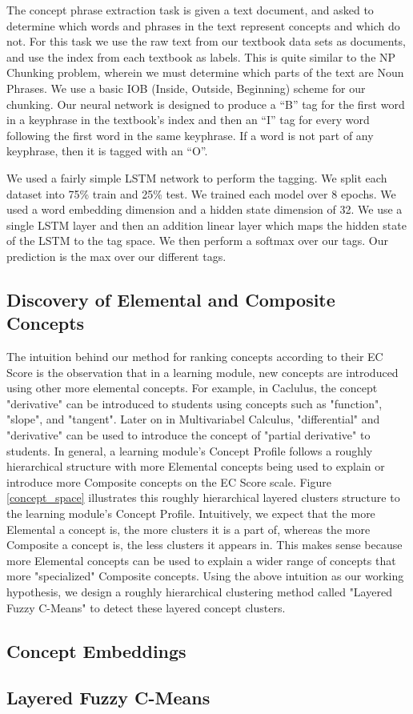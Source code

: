The concept phrase extraction task is given a text document, and asked to determine which words and phrases in the text represent concepts and which do not. For this task we use the raw text from our textbook data sets as documents, and use the index from each textbook as labels. This is quite similar to the NP Chunking problem, wherein we must determine which parts of the text are Noun Phrases. We use a basic IOB (Inside, Outside, Beginning) scheme for our chunking.
Our neural network is designed to produce a ``B'' tag for the first word in a keyphrase in the textbook's index and then an ``I'' tag for every word following the first word in the same keyphrase. If a word is not part of any keyphrase, then it is tagged with an ``O''.

We used a fairly simple LSTM network to perform the tagging. We split each dataset into 75\% train and 25\% test. We trained each model over 8 epochs. We used a word embedding dimension and a hidden state dimension of 32. We use a single LSTM layer and then an addition linear layer which maps the hidden state of the LSTM to the tag space. We then perform a softmax over our tags. Our prediction is the max over our different tags.


\subsection{Discovery of Elemental and Composite Concepts}



The intuition behind our method for ranking concepts according to their EC Score is the observation that in a learning module, new concepts are introduced using other more elemental concepts. For example, in Caclulus, the concept "derivative" can be introduced to students using concepts such as "function", "slope", and "tangent". Later on in Multivariabel Calculus, "differential" and "derivative" can be used to introduce the concept of "partial derivative" to students. In general, a learning module's Concept Profile follows a roughly hierarchical structure with more Elemental concepts being used to explain or introduce more Composite concepts on the EC Score scale. Figure \ref{concept_space} illustrates this roughly hierarchical layered clusters structure to the learning module's Concept Profile. Intuitively, we expect that the more Elemental a concept is, the more clusters it is a part of, whereas the more Composite a concept is, the less clusters it appears in. This makes sense because more Elemental concepts can be used to explain a wider range of concepts that more "specialized" Composite concepts. Using the above intuition as our working hypothesis, we design a roughly hierarchical clustering method called "Layered Fuzzy C-Means" to detect these layered concept clusters.

\subsection{Concept Embeddings}
\subsection{Layered Fuzzy C-Means}

